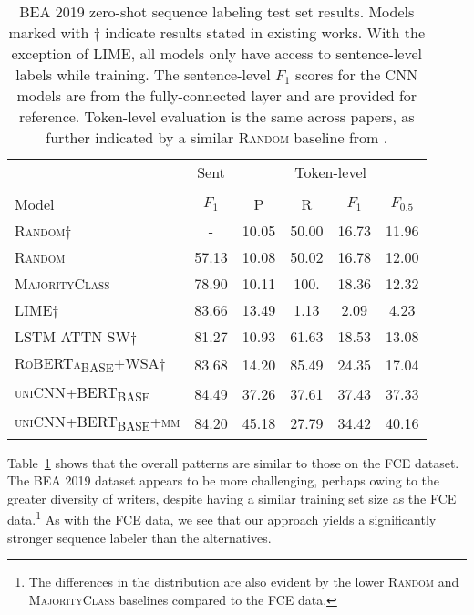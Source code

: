 \documentclass{clv3}
\begin{document}
\begin{table}
\caption[Main results]{BEA 2019 zero-shot sequence labeling test set results. Models marked with $\dagger$ indicate results stated in existing works. With the exception of \textsc{LIME}, all models only have access to sentence-level labels while training. The sentence-level $F_1$ scores for the CNN models are from the fully-connected layer and are provided for reference. Token-level evaluation is the same across papers, as further indicated by a similar \textsc{Random} baseline from \citet{BujelEtAl-2021-Zeroshot-Weighted-Attention}.} 
\label{table:bea2019-test-results}
\begin{tabular}{lccccc}
\toprule
 & \multicolumn{1}{c}{Sent} & \multicolumn{4}{c}{Token-level} \\
 \cmidrule[0.75pt](lr){2-2}\cmidrule[0.75pt](lr){3-6} \\
Model & $F_1$ & P & R & $F_1$ & $F_{0.5}$ \\
\midrule
\textsc{Random}$\dagger$ & - & 10.05 & 50.00 & 16.73 & 11.96\\
\textsc{Random} & 57.13 & 10.08 & 50.02 & 16.78 & 12.00\\
\textsc{MajorityClass} & 78.90 & 10.11 & 100. & 18.36 & 12.32\\
\midrule
\textsc{LIME}$\dagger$ & 83.66 & 13.49 & 1.13 & 2.09 & 4.23\\
\midrule
\textsc{LSTM-ATTN-SW}$\dagger$ & 81.27 & 10.93 & 61.63 & 18.53 & 13.08\\
\textsc{RoBERTa\textsubscript{BASE}+WSA}$\dagger$ & 83.68 & 14.20 & 85.49 & 24.35 & 17.04\\
\midrule
\textsc{uniCNN+BERT\textsubscript{BASE}} & 84.49 & 37.26 & 37.61 & 37.43 & 37.33 \\
\textsc{uniCNN+BERT\textsubscript{BASE}+mm} & 84.20 & 45.18 & 27.79 & 34.42 & 40.16 \\
\bottomrule
\end{tabular}
\end{table} 

Table~\ref{table:bea2019-test-results} shows that the overall patterns are similar to those on the FCE dataset. The BEA 2019 dataset appears to be more challenging, perhaps owing to the greater diversity of writers, despite having a similar training set size as the FCE data.\footnote{The differences in the distribution are also evident by the lower \textsc{Random} and \textsc{MajorityClass} baselines compared to the FCE data.} As with the FCE data, we see that our approach yields a significantly stronger sequence labeler than the alternatives. 
\end{document}
